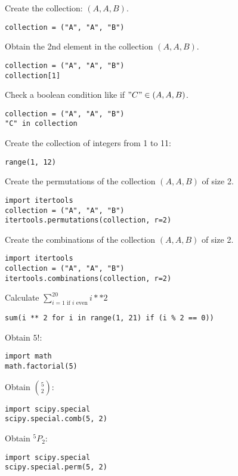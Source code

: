 \documentclass{article}
\begin{document}
\begin{multicols}{2}
    Create the collection: \((A, A, B)\).

        \begin{verbatim}
collection = ("A", "A", "B")
    \end{verbatim}

        Obtain the 2nd element in the collection \((A, A, B)\).

        \begin{verbatim}
collection = ("A", "A", "B")
collection[1]
        \end{verbatim}

        Check a boolean condition like if \("C"\in (A, A, B)\).

        \begin{verbatim}
collection = ("A", "A", "B")
"C" in collection
        \end{verbatim}

        Create the collection of integers from 1 to 11:

        \begin{verbatim}
range(1, 12)
        \end{verbatim}

        Create the permutations of the collection \((A, A, B)\) of size 2.

        \begin{verbatim}
import itertools
collection = ("A", "A", "B")
itertools.permutations(collection, r=2)
        \end{verbatim}

        Create the combinations of the collection \((A, A, B)\) of size 2.

        \begin{verbatim}
import itertools
collection = ("A", "A", "B")
itertools.combinations(collection, r=2)
        \end{verbatim}

        Calculate \(\sum_{i=1\text{ if }i\text{ even}}^{20}i ** 2\)

        \begin{verbatim}
sum(i ** 2 for i in range(1, 21) if (i % 2 == 0))
        \end{verbatim}

        Obtain \(5!\):

        \begin{verbatim}
import math
math.factorial(5)
        \end{verbatim}

        Obtain \({5 \choose 2}\):

        \begin{verbatim}
import scipy.special
scipy.special.comb(5, 2)
        \end{verbatim}

        Obtain \(^5 P_2\):

        \begin{verbatim}
import scipy.special
scipy.special.perm(5, 2)
        \end{verbatim}


\end{multicols}
\end{document}
